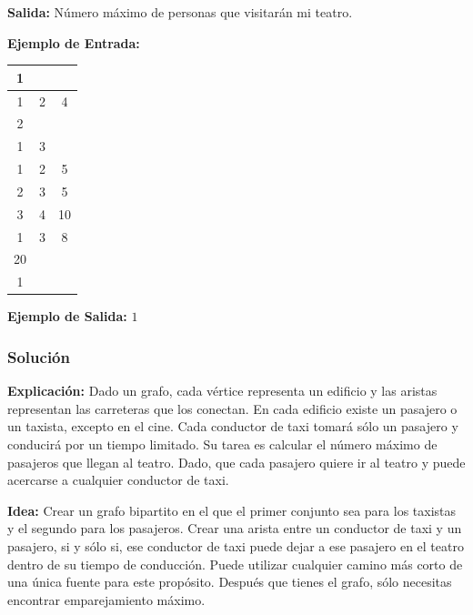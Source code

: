 \documentclass[12pt]{article}
\newcommand{\nl}{\vspace{0.3cm}}
\begin{document}
\nl

\textbf{Salida:} Número máximo de personas que visitarán mi teatro.

\newpage

\textbf{Ejemplo de Entrada:}

\nl

\begin{tabular}{|c|c|c|}
	\hline 1 &  &  \\ 
	\hline 1 & 2 & 4 \\ 
	\hline 2 &  &  \\ 
	\hline 1 & 3 &  \\ 
	\hline 1 & 2 & 5 \\ 
	\hline 2 & 3 & 5 \\ 
	\hline 3 & 4 & 10 \\ 
	\hline 1 & 3 & 8 \\ 
	\hline 20 &  &  \\ 
	\hline 1 &  &  \\ 
	\hline 
\end{tabular} 

\nl

\textbf{Ejemplo de Salida:} $1$

\nl

\subsubsection{Solución}

\nl

\textbf{Explicación:} Dado un grafo, cada vértice representa un edificio y las aristas representan las carreteras que los conectan. En cada edificio existe un pasajero o un taxista, excepto en el cine. Cada conductor de taxi tomará sólo un pasajero y conducirá por un tiempo limitado. Su tarea es calcular el número máximo de pasajeros que llegan al teatro. Dado, que cada pasajero quiere ir al teatro y puede acercarse a cualquier conductor de taxi.

\nl

\textbf{Idea:} Crear un grafo bipartito en el que el primer conjunto sea para los taxistas y el segundo para los pasajeros. Crear una arista entre un conductor de taxi y un pasajero, si y sólo si, ese conductor de taxi puede dejar a ese pasajero en el teatro dentro de su tiempo de conducción. Puede utilizar cualquier camino más corto de una única fuente para este propósito. Después que tienes el grafo, sólo necesitas encontrar emparejamiento máximo.

\nl
\end{document}
